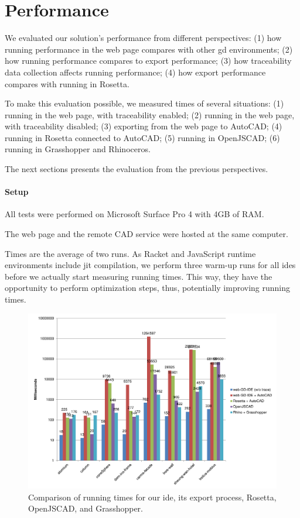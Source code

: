\section{Performance}
\label{sec:eval:performance}
We evaluated our solution's performance from different perspectives:
(1) how running performance in the web page compares with other \gls{gd} environments;
(2) how running performance compares to export performance;
(3) how traceability data collection affects running performance;
(4) how export performance compares with running in Rosetta.

To make this evaluation possible, we measured times of several situations:
(1) running in the web page, with traceability enabled;
(2) running in the web page, with traceability disabled;
(3) exporting from the web page to AutoCAD;
(4) running in Rosetta connected to AutoCAD;
(5) running in OpenJSCAD;
(6) running in Grasshopper and Rhinoceros.

The next sections presents the evaluation from the previous perspectives.

\paragraph{Setup}
All tests were performed on Microsoft Surface Pro 4 with 4GB of RAM.

The web page and the remote CAD service were hosted at the same computer.

Times are the average of two runs.
As Racket and JavaScript runtime environments include \gls{jit} compilation, we perform three warm-up runs for all \glspl{ide} before we actually start measuring running times.
This way, they have the opportunity to perform optimization steps, thus, potentially improving running times.


\begin{figure}
  \centering
  \includegraphics[width=1.0\textwidth]{./images/run_export_rosetta_times}
  \caption{Comparison of running times for our \gls{ide}, its export process, Rosetta, OpenJSCAD, and Grasshopper.}
  \label{fig:run:export:rosetta:chart}
\end{figure}


